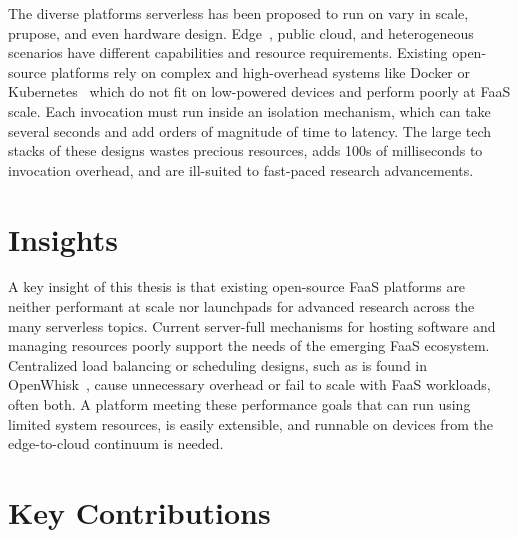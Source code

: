 \documentclass[pageno]{jpaper}
\begin{document}
The diverse platforms serverless has been proposed to run on vary in scale, prupose, and even hardware design.
Edge~\cite{hall_execution_2019}, public cloud, and heterogeneous~\cite{du2022serverless} scenarios have different capabilities and resource requirements.
Existing open-source platforms rely on complex and high-overhead systems like Docker or Kubernetes~\cite{openwhisk,openfaas} which do not fit on low-powered devices and perform poorly at FaaS scale.
Each invocation must run inside an isolation mechanism, which can take several seconds and add orders of magnitude of time to latency.
The large tech stacks of these designs wastes precious resources, adds 100s of milliseconds to invocation overhead, and are ill-suited to fast-paced research advancements.

\section{Insights}

A key insight of this thesis is that existing open-source FaaS platforms are neither performant at scale nor launchpads for advanced research across the many serverless topics. 
Current server-full mechanisms for hosting software and managing resources poorly support the needs of the emerging FaaS ecosystem.
Centralized load balancing or scheduling designs, such as is found in OpenWhisk~\cite{openwhisk}, cause unnecessary overhead or fail to scale with FaaS workloads, often both.
A platform meeting these performance goals that can run using limited system resources, is easily extensible, and runnable on devices from the edge-to-cloud continuum is needed.


\section{Key Contributions}
\end{document}
